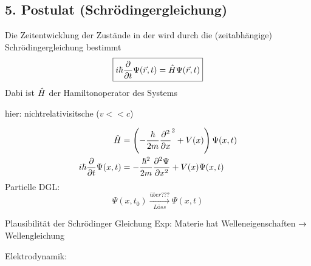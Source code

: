 \subsection{5. Postulat (Schrödingergleichung)} %
\label{sub:5._Postulat_(Schrödingergleichung)}
Die Zeitentwicklung der Zustände in der \QM wird durch die (zeitabhängige)
Schrödingergleichung bestimmt
\begin{equation*}
    \boxed{
        i \hbar  \frac{\partial }{\partial t } \Psi(\vec{r},t) = \hat{H}\Psi(\vec{r},t)
        }
\end{equation*}
Dabi ist $\hat{H}$ der Hamiltonoperator des Systems
\begin{bem}
    \item
    hier: nichtrelativisitsche \QM ($v <<  c$)
    \item
    \begin{align*}
        \hat{H} &= \left( - \frac{\hbar}{2m}\frac{\partial^2}{\partial x}^2 + V(x) \right) \Psi(x,t) \\
        i\hbar \frac{\partial}{\partial t} \Psi(x,t) 
        &=
        - \frac{\hbar^2}{2m} \frac{\partial^2 \Psi}{\partial x^2} + V(x)
        \Psi(x,t)
    \end{align*}    
    Partielle DGL:
    \begin{equation*}
        \Psi(x,t_0) \xrightarrow[Löss]{über ???} \Psi(x,t)
    \end{equation*}
    \item{Plausibilität der Schrödinger Gleichung}
    Exp: Materie hat Welleneigenschaften $\rightarrow$ Wellengleichung

    Elektrodynamik: 
    

\end{bem}
